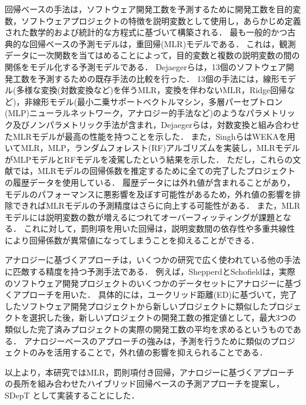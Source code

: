 回帰ベースの手法は，ソフトウェア開発工数を予測するために開発工数を目的変数，ソフトウェアプロジェクトの特徴を説明変数として使用し，あらかじめ定義された数学的および統計的な方程式に基づいて構築される．
最も一般的かつ古典的な回帰ベースの予測モデルは，重回帰(MLR)モデルである．
これは，観測データに一次関数を当てはめることによって，目的変数と複数の説明変数の間の関係をモデル化する予測モデルである．
Dejaegerら\cite{Dejaeger2012}は，13個のソフトウェア開発工数を予測するための既存手法の比較を行った．
13個の手法には，線形モデル(多様な変換(対数変換など)を伴うMLR，変換を伴わないMLR，Ridge回帰など)，非線形モデル(最小二乗サポートベクトルマシン，多層パーセプトロン(MLP)ニューラルネットワーク，アナロジー的手法など)のようなパラメトリック及びノンパラメトリック手法が含まれ，Dejaegerら\cite{Dejaeger2012}は，対数変換と組み合わせたMLRモデルが最高の性能を持つことを示した．
また，Singhら\cite{Singh2020}はWEKA\footnotemark[6]を用いてMLR，MLP，ランダムフォレスト(RF)アルゴリズムを実装し，MLRモデルがMLPモデルとRFモデルを凌駕したという結果を示した．
ただし，これらの文献では，MLRモデルの回帰係数を推定するために全ての完了したプロジェクトの履歴データを使用している．
履歴データには外れ値が含まれることがあり，モデルのパフォーマンスに悪影響を及ぼす可能性があるため，外れ値の影響を排除できればMLRモデルの予測精度はさらに向上する可能性がある．
また，MLRモデルには説明変数の数が増えるにつれてオーバーフィッティングが課題となる．
これに対して，罰則項を用いた回帰は，説明変数間の依存性や多重共線性により回帰係数が異常値になってしまうことを抑えることができる\cite{Xiao2022}．

アナロジーに基づくアプローチは，いくつかの研究で広く使われている他の手法に匹敵する精度を持つ予測手法である\cite{Boehm1984}．
例えば，ShepperdとSchofield\cite{Shepperd1997}は，実際のソフトウェア開発プロジェクトのいくつかのデータセットにアナロジーに基づくアプローチを用いた．
具体的には，ユークリッド距離(ED)に基づいて，完了したソフトウェア開発プロジェクトから新しいプロジェクトに類似したプロジェクトを選択した後，新しいプロジェクトの開発工数の推定値として，最大3つの類似した完了済みプロジェクトの実際の開発工数の平均を求めるというものである．
アナロジーベースのアプローチの強みは，予測を行うために類似のプロジェクトのみを活用することで，外れ値の影響を抑えられることである．

以上より，本研究ではMLR，罰則項付き回帰，アナロジーに基づくアプローチの長所を組み合わせたハイブリッド回帰ベースの予測アプローチを提案し，SDepT
として実装することにした．


